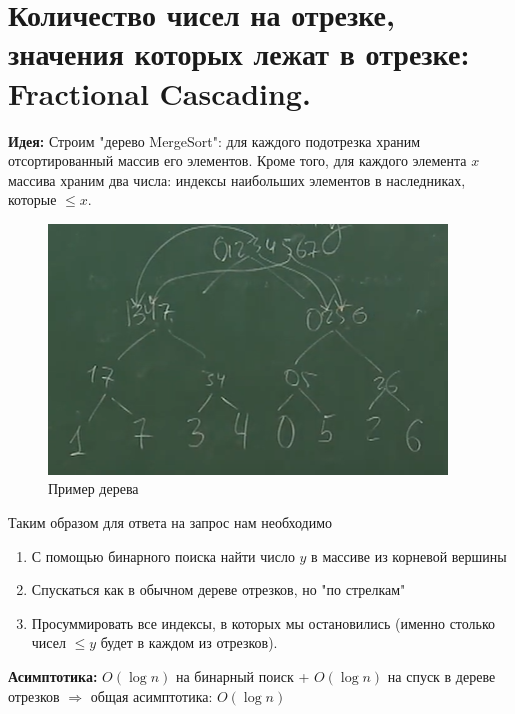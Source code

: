 \section{Количество чисел на отрезке, значения которых лежат в отрезке: Fractional Cascading.}
\par \textbf{Идея:} Строим "дерево MergeSort": для каждого подотрезка храним отсортированный массив его элементов. Кроме того, для каждого элемента $x$ массива храним два числа: индексы наибольших элементов в наследниках, которые $\leqslant x$.
\begin{figure}[h]
    \centering
    \includegraphics{images/63-64_fractional cascading}
    \caption{Пример дерева}
\end{figure}
\par Таким образом для ответа на запрос нам необходимо \begin{enumerate}
    \item С помощью бинарного поиска найти число $y$ в массиве из корневой вершины
    \item Спускаться как в обычном дереве отрезков, но "по стрелкам"
    \item Просуммировать все индексы, в которых мы остановились (именно столько чисел $\leqslant y$ будет в каждом из отрезков).
\end{enumerate}
\par \textbf{Асимптотика:} $O(\log n)$ на бинарный поиск + $O(\log n)$ на спуск в дереве отрезков $\Rightarrow$ общая асимптотика: $O(\log n)$
